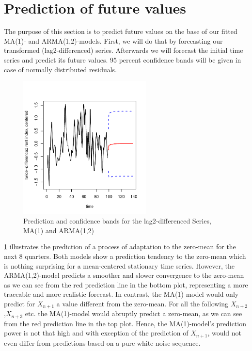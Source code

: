 \documentclass[11pt,a4paper]{article}
\begin{document}

\section{Prediction of future values}

The purpose of this section is to predict future values on the base of our fitted MA(1)- and ARMA(1,2)-models.
First, we will do that by forecasting our transformed (lag2-differenced) series.
Afterwards we will forecast the initial time series and predict its future values.
95 percent confidence bands will be given in case of normally distributed residuals.

\begin{figure} [ht]
    \centering
    \includegraphics[width=0.6\textwidth]{pred_transformed_series}
    \caption{Prediction and confidence bands for the lag2-differenced Series, MA(1) and ARMA(1,2)}
    \label{fig:pred_transformed_series}
\end{figure}

\cref{fig:pred_transformed_series} illustrates the prediction of a process of adaptation to the zero-mean for the next 8 quarters.
Both models show a prediction tendency to the zero-mean which is nothing surprising for a mean-centered stationary time series. However, the ARMA(1,2)-model predicts a smoother and slower convergence to the zero-mean as we can see from the red prediction line in the bottom plot, representing a more traceable and more realistic forecast. In contrast, the MA(1)-model would only predict for $X_{n+1}$ a value different from the zero-mean. For all the following $X_{n+2}$,$X_{n+3}$ etc. the MA(1)-model would abruptly predict a zero-mean, as we can see from the red prediction line in the top plot. Hence, the MA(1)-model's prediction power is not that high and with exception of the prediction of $X_{n+1}$, would not even differ from predictions based on a pure white noise sequence.  
\end{document}
